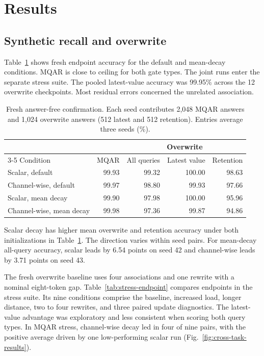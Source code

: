 \documentclass[conference]{IEEEtran}
\begin{document}
\section{Results}
\subsection{Synthetic recall and overwrite}
Table~\ref{tab:confirmation} shows fresh endpoint accuracy for the default and mean-decay conditions. MQAR is close to ceiling for both gate types. The joint runs enter the separate stress suite. The pooled latest-value accuracy was 99.95\% across the 12 overwrite checkpoints. Most residual errors concerned the unrelated association.

\begin{table}[t]
\caption{Fresh answer-free confirmation. Each seed contributes 2,048 MQAR answers and 1,024 overwrite answers (512 latest and 512 retention). Entries average three seeds (\%).}
\label{tab:confirmation}
\centering
\scriptsize
\setlength{\tabcolsep}{3pt}
\begin{tabular}{lrrrr}
\toprule
 & & \multicolumn{3}{c}{Overwrite} \\
\cmidrule(l){3-5}
Condition & MQAR & All queries & Latest value & Retention \\
\midrule
Scalar, default & 99.93 & 99.32 & 100.00 & 98.63 \\
Channel-wise, default & 99.97 & 98.80 & 99.93 & 97.66 \\
Scalar, mean decay & 99.90 & 97.98 & 100.00 & 95.96 \\
Channel-wise, mean decay & 99.98 & 97.36 & 99.87 & 94.86 \\
\bottomrule
\end{tabular}
\end{table}

Scalar decay has higher mean overwrite and retention accuracy under both initializations in Table~\ref{tab:confirmation}. The direction varies within seed pairs. For mean-decay all-query accuracy, scalar leads by 6.54 points on seed 42 and channel-wise leads by 3.71 points on seed 43.

The fresh overwrite baseline uses four associations and one rewrite with a nominal eight-token gap. Table~\ref{tab:stress-endpoint} compares endpoints in the stress suite. Its nine conditions comprise the baseline, increased load, longer distance, two to four rewrites, and three paired update diagnostics. The latest-value advantage was exploratory and less consistent when scoring both query types. In MQAR stress, channel-wise decay led in four of nine pairs, with the positive average driven by one low-performing scalar run (Fig.~\ref{fig:cross-task-results}).
\end{document}
